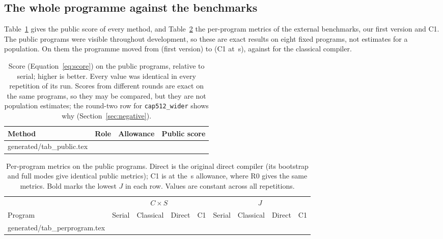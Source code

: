 \documentclass[11pt,a4paper]{article}
\makeatletter
\newcommand{\tableinput}[1]{\@@input #1 }
\makeatother
\begin{document}
\subsection{The whole programme against the benchmarks}
Table~\ref{tab:public} gives the public score of every method, and
Table~\ref{tab:perprogram} the per-program metrics of the external benchmarks, our
first version and C1. The public programs were visible throughout development,
so these are exact results on eight fixed programs, not estimates for a
population. On them the programme moved from  (first version) to
 (C1 at \,s), against  for the classical
compiler.

\begin{table}[htbp]\centering\small
\begin{tabular}{llll}\toprule
Method & Role & Allowance & Public score\\\midrule
\tableinput{generated/tab_public.tex}
\bottomrule\end{tabular}
\caption{Score (Equation~\ref{eq:score}) on the  public programs,
relative to serial; higher is better. Every value was identical in every
repetition of its run. Scores from different rounds are exact on the same
programs, so they may be compared, but they are not population estimates; the
round-two row for \texttt{cap512\_wider} shows why (Section~\ref{sec:negative}).}
\label{tab:public}
\end{table}

\begin{table}[htbp]\centering\small
\begin{tabular}{lllllrrrr}\toprule
& \multicolumn{4}{c}{$C\times S$} & \multicolumn{4}{c}{$J$}\\
\cmidrule(lr){2-5}\cmidrule(lr){6-9}
Program & Serial & Classical & Direct & C1 & Serial & Classical & Direct & C1\\\midrule
\tableinput{generated/tab_perprogram.tex}
\bottomrule\end{tabular}
\caption{Per-program metrics on the public programs. Direct is the original
direct compiler (its bootstrap and full modes give identical public metrics); C1 is
at the \,s allowance, where R0 gives the same metrics. Bold marks the lowest
$J$ in each row. Values are constant across all repetitions.}\label{tab:perprogram}
\end{table}
\end{document}
